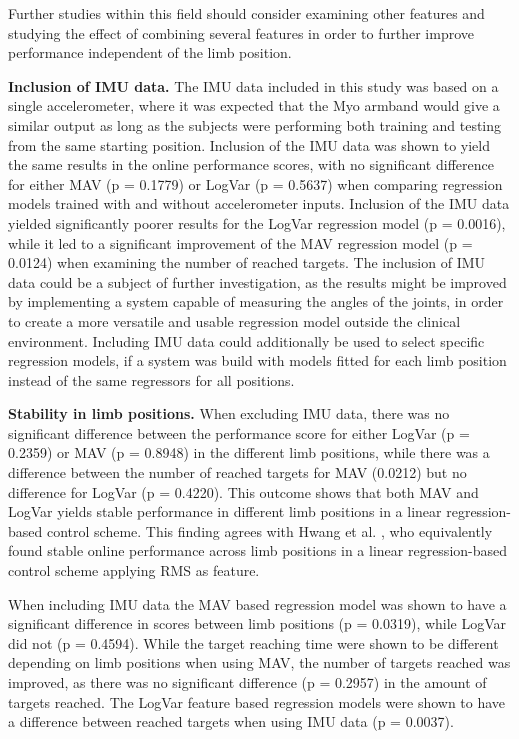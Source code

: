 \begin{multicols}{2}
Further studies within this field should consider examining other features and studying the effect of combining several features in order to further improve performance independent of the limb position.

\textbf{Inclusion of IMU data.}
The IMU data included in this study was based on a single accelerometer, where it was expected that the Myo armband would give a similar output as long as the subjects were performing both training and testing from the same starting position. Inclusion of the IMU data was shown to yield the same results in the online performance scores, with no significant difference for either MAV (p = 0.1779) or LogVar (p = 0.5637) when comparing regression models trained with and without accelerometer inputs. Inclusion of the IMU data yielded significantly poorer results for the LogVar regression model (p = 0.0016), while it led to a significant improvement of the MAV regression model (p = 0.0124) when examining the number of reached targets. The inclusion of IMU data could be a subject of further investigation, as the results might be improved by implementing a system capable of measuring the angles of the joints, in order to create a more versatile and usable regression model outside the clinical environment. Including IMU data could additionally be used to select specific regression models, if a system was build with models fitted for each limb position instead of the same regressors for all positions. 

\textbf{Stability in limb positions.}
When excluding IMU data, there was no significant difference between the performance score for either LogVar (p = 0.2359) or MAV (p = 0.8948) in the different limb positions, while there was a difference between the number of reached targets for MAV (0.0212) but no difference for LogVar (p = 0.4220). This outcome shows that both MAV and LogVar yields stable performance in different limb positions in a linear regression-based control scheme. This finding agrees with Hwang et al. \cite{Hwang2017}, who equivalently found stable online performance across limb positions in a linear regression-based control scheme applying RMS as feature.

When including IMU data the MAV based regression model was shown to have a significant difference in scores between limb positions (p = 0.0319), while LogVar did not (p = 0.4594). While the target reaching time were shown to be different depending on limb positions when using MAV, the number of targets reached was improved, as there was no significant difference (p = 0.2957) in the amount of targets reached. The LogVar feature based regression models were shown to have a difference between reached targets when using IMU data (p = 0.0037).


\end{multicols}
